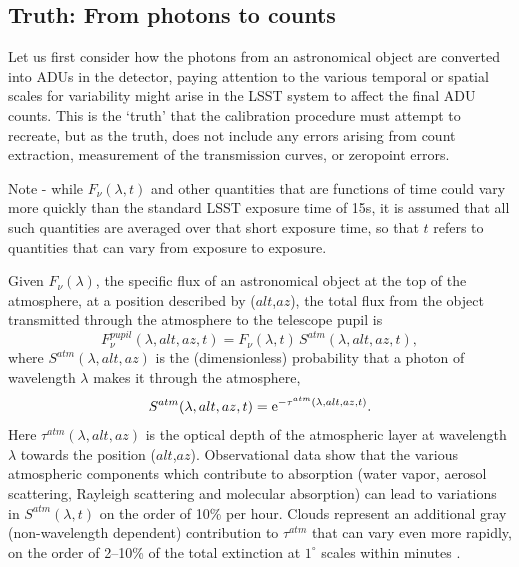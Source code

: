\documentclass[12pt,preprint]{aastex}
\begin{document}
\subsection{Truth: From photons to counts}

Let us first consider how the photons from an astronomical object are
converted into ADUs in the detector, paying attention to the various
temporal or spatial scales for variability might arise in the LSST
system to affect the final ADU counts. This is the `truth' that the
calibration procedure must attempt to recreate, but as the truth, does
not include any errors arising from count extraction, measurement of
the transmission curves, or zeropoint errors.

Note - while $F_\nu(\lambda,t)$ and other quantities that are functions of time
could vary more quickly than the standard LSST exposure time of 15s, it is
assumed that all such quantities are averaged over that short exposure time, so 
that $t$ refers to quantities that can vary from exposure to exposure. 

Given $F_\nu(\lambda)$, the specific flux of an astronomical object at
the top of the atmosphere, at a position described by ($alt$,$az$),
the total flux from the object transmitted through the atmosphere to the telescope pupil is
\begin{equation}
\label{eqn:Fpupil}
   F_\nu^{pupil}(\lambda,alt,az,t) = F_\nu(\lambda, t) \, S^{atm}(\lambda,alt,az,t),
\end{equation}
where $S^{atm}(\lambda,alt,az)$ is the (dimensionless) probability that a photon of 
wavelength $\lambda$ makes it through the atmosphere,
\begin{equation}
\label{eqn:atmTau}
   S^{atm}(\lambda,alt,az,t)   = {\rm e}^{-\tau^{atm}(\lambda,alt,az,t)}.
\end{equation}
Here $\tau^{atm}(\lambda,alt,az)$ is the optical depth of the
atmospheric layer at wavelength $\lambda$ towards the position
($alt$,$az$). Observational data \citep{Stubbs2007b, Burke2010b} show
that the various atmospheric components which contribute to absorption
(water vapor, aerosol scattering, Rayleigh scattering and molecular
absorption) can lead to variations in $S^{atm}(\lambda,t)$ on the
order of 10\% per hour. Clouds represent an additional gray (non-wavelength
dependent) contribution to $\tau^{atm}$ that can vary even more
rapidly, on the order of 2--10\% of the total extinction at $1^{\circ}$
scales within minutes \citep{Ivezic2007}.
\end{document}
